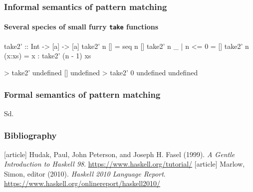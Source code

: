 \documentclass{beamer}
\begin{document}
\begin{frame}[fragile]
  \frametitle{Informal semantics of pattern matching}
  \framesubtitle{Several species of small furry \texttt{take} functions}

  \begin{code}
take2' :: Int -> [a] -> [a]
take2' n []              = seq n []
take2' n _      | n <= 0 = []
take2' n (x:xs)          = x : take2' (n - 1) xs
  \end{code}
  \begin{code}
> take2' undefined []
undefined
> take2' 0 undefined
undefined
  \end{code}
\end{frame}


\begin{frame}
  \frametitle{Formal semantics of pattern matching}

  Sd.
\end{frame}


\begin{frame}
  \frametitle{Bibliography}

  \begin{thebibliography}{Hudak, Peterson, and Fasel 1999}
  [article]
    Hudak, Paul, John Peterson, and Joseph H. Fasel (1999).
    \newblock \emph{A Gentle Introduction to Haskell 98}.
    \newblock \url{https://www.haskell.org/tutorial/}
  [article]
    Marlow, Simon, editor (2010).
    \newblock \emph{Haskell 2010 Language Report}.
    \newblock \url{https://www.haskell.org/onlinereport/haskell2010/}
  \end{thebibliography}
\end{frame}

\end{document}
